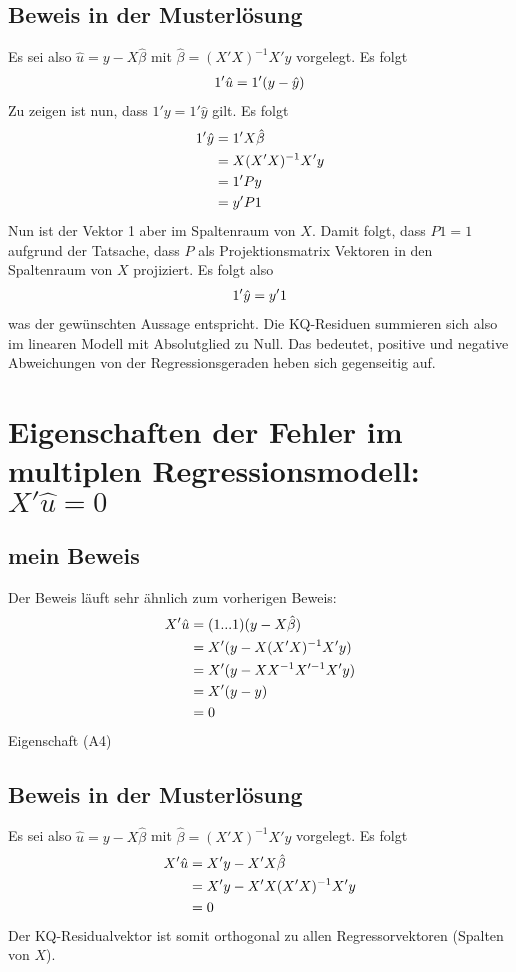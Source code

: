 \documentclass{article}
\begin{document}
	\subsection{Beweis in der Musterlösung}
	Es sei also $\hat{u}=y-X\hat{\beta}$ mit $\hat{\beta}=(X'X)^{-1}X'y$ vorgelegt. Es folgt
	\begin{align}
		1'\hat{u} = 1'(y-\hat{y}) \notag
	\end{align}
	Zu zeigen ist nun, dass $1'y = 1'\hat{y}$ gilt. Es folgt
	\begin{align}
		1'\hat{y} &= 1'X\hat{\beta} \notag \\
		&= X(X'X)^{-1}X'y \notag \\
		&= 1'Py \notag \\
		&= y'P1 \notag
	\end{align}
	Nun ist der Vektor 1 aber im Spaltenraum von $X$. Damit folgt, dass $P1 = 1$ aufgrund der Tatsache, dass $P$ als Projektionsmatrix Vektoren in den Spaltenraum von $X$ projiziert. Es folgt also
	\begin{align}
		1'\hat{y} = y'1 \notag
	\end{align}
	was der gewünschten Aussage entspricht. Die KQ-Residuen summieren sich also im linearen Modell mit Absolutglied zu Null. Das bedeutet, positive und negative Abweichungen von der Regressionsgeraden heben sich gegenseitig auf.
	
	\section{Eigenschaften der Fehler im multiplen Regressionsmodell: $X'\hat{u}=0$}
	\subsection{mein Beweis}
	Der Beweis läuft sehr ähnlich zum vorherigen Beweis:
	\begin{align}
		X'\hat{u} &= (1 ... 1)(y-X\hat{\beta}) \notag \\
		&= X'(y-X(X'X)^{-1}X'y) \notag \\
		&= X'(y-XX^{-1}X'^{-1}X'y) \notag \\
		&= X'(y-y) \notag \\
		&= 0 \notag
	\end{align}
	Eigenschaft (A4)
	
	\subsection{Beweis in der Musterlösung}
	Es sei also $\hat{u}=y-X\hat{\beta}$ mit $\hat{\beta}=(X'X)^{-1}X'y$ vorgelegt. Es folgt
	\begin{align}
		X'\hat{u} &= X'y-X'X\hat{\beta} \notag \\
		&= X'y - X'X(X'X)^{-1}X'y \notag \\
		&= 0 \notag
	\end{align}
	Der KQ-Residualvektor ist somit orthogonal zu allen Regressorvektoren (Spalten von $X$).
	
\end{document}
